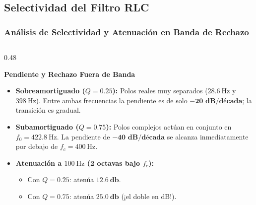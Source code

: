 \subsection{Selectividad del Filtro RLC}
\begin{frame}
  \frametitle{Análisis de Selectividad y Atenuación en Banda de Rechazo}

  \begin{columns}[t, onlytextwidth]
    \begin{column}{0.48\textwidth}
      \begin{tarjeta}
        {\fontsize{8.5pt}{10.5pt}\selectfont \textbf{\color{NavyDark} Pendiente y Rechazo Fuera de Banda}}\\[2pt]
        {\fontsize{7.5pt}{9.2pt}\selectfont
        \begin{itemize}\setlength{\itemsep}{2pt}
          \item \textbf{Sobreamortiguado ($Q = 0.25$):}
          Polos reales muy separados ($\qty{28.6}{\hertz}$ y $\qty{398}{\hertz}$). Entre ambas frecuencias la pendiente es de solo $\mathbf{-20\text{ dB/década}}$; la transición es gradual.
          \item \textbf{Subamortiguado ($Q = 0.75$):}
          Polos complejos actúan en conjunto en $f_0 = \qty{422.8}{\hertz}$. La pendiente de $\mathbf{-40\text{ dB/década}}$ se alcanza inmediatamente por debajo de $f_c = \qty{400}{\hertz}$.
          \item \textbf{Atenuación a $\qty{100}{\hertz}$ (2 octavas bajo $f_c$):}
          \begin{itemize}\setlength{\itemsep}{1pt}
            \item Con $Q = 0.25$: atenúa $\mathbf{\qty{12.6}{\decibel}}$.
            \item Con $Q = 0.75$: atenúa $\mathbf{\qty{25.0}{\decibel}}$ (¡el doble en dB!).
          \end{itemize}
        \end{itemize}
        }
      \end{tarjeta}
    \end{column}


\end{columns}
\end{frame}
